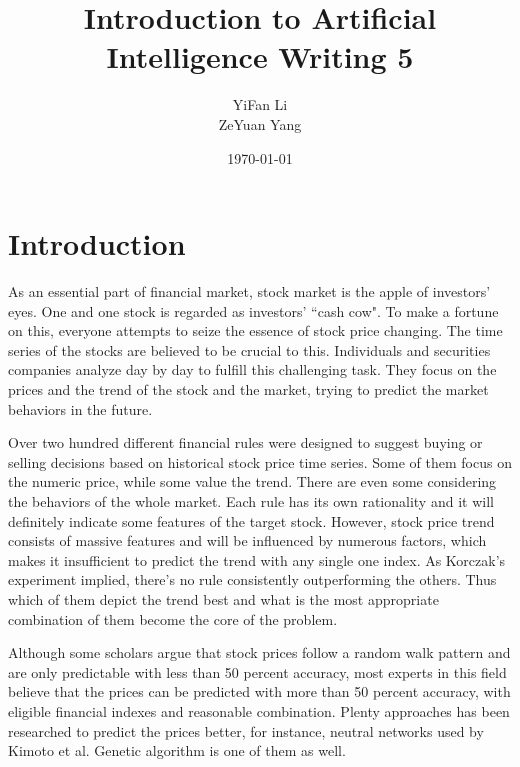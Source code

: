 \documentclass{article}
\title{Introduction to Artificial Intelligence Writing 5}
\author{YiFan Li\\ZeYuan Yang}
\date{\today}
\begin{document}
\maketitle
{}



\section{Introduction}

As an essential part of financial market, stock market is the apple of investors' eyes.
One and one stock is regarded as investors' ``cash cow".
To make a fortune on this, everyone attempts to seize the essence of stock price changing.
The time series of the stocks are believed to be crucial to this.
Individuals and securities companies analyze day by day to fulfill this challenging task.
They focus on the prices and the trend of the stock and the market,
trying to predict the market behaviors in the future.

Over two hundred different financial rules were designed to
suggest buying or selling decisions based on historical stock price time series. \cite{stock-timing-using-genetic-algorithms}
Some of them focus on the numeric price, while some value the trend.
There are even some considering the behaviors of the whole market.
Each rule has its own rationality and it will definitely indicate some features of the target stock.
However, stock price trend consists of massive features and will be influenced by numerous factors,
which makes it insufficient to predict the trend with any single one index.
As Korczak's experiment implied, there's no rule consistently outperforming the others. \cite{stock-timing-using-genetic-algorithms}
Thus which of them depict the trend best and what is the most appropriate combination of them become the core of the problem.

Although some scholars argue that stock prices follow a random walk pattern
and are only predictable with less than 50 percent accuracy,
most experts in this field believe that the prices can be predicted with more than 50 percent accuracy,
with eligible financial indexes and reasonable combination. \cite{stock-market-prediction-with-multiple-classifiers}
Plenty approaches has been researched to predict the prices better,
for instance, neutral networks used by Kimoto et al. \cite{stock-market-prediction-system-with-modular-neural-networks}
Genetic algorithm is one of them as well.
\end{document}
